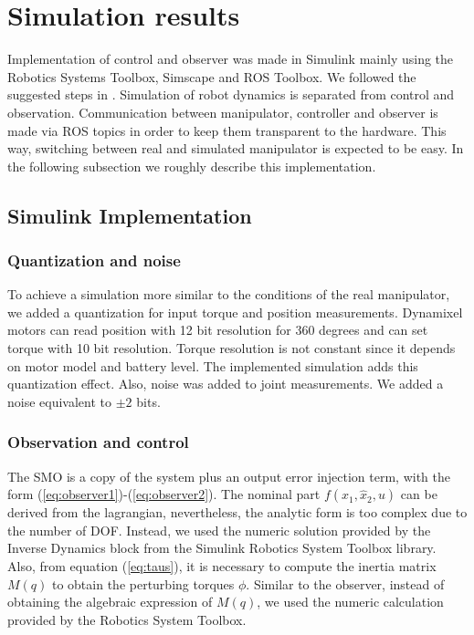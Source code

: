 \documentclass[conference,letterpaper]{ieeeconf}
\begin{document}
\section{Simulation results}
\label{sec:Results}

Implementation of control and observer was made in Simulink mainly using the Robotics Systems Toolbox, Simscape and ROS Toolbox. We followed the suggested steps in \cite{matlab_designing, matlab_trajectory}. Simulation of robot dynamics is separated from control and observation. Communication between manipulator, controller and observer is made via ROS topics in order to keep them transparent to the hardware. This way, switching between real and simulated manipulator is expected to be easy. In the following subsection we roughly describe this implementation.

\subsection{Simulink Implementation}
\subsubsection*{Quantization and noise}
To achieve a simulation more similar to the conditions of the real manipulator, we added a quantization for input torque and position measurements. Dynamixel motors can read position with 12 bit resolution for 360 degrees and can set torque with 10 bit resolution. Torque resolution is not constant since it depends on motor model and battery level. The implemented simulation adds this quantization effect. Also, noise was added to joint measurements. We added a noise equivalent to $\pm 2$ bits. 

\subsubsection*{Observation and control}
The SMO is a copy of the system plus an output error injection term, with the form (\ref{eq:observer1})-(\ref{eq:observer2}). The nominal part $f(x_1, \hat{x}_2, u)$ can be derived from the lagrangian, nevertheless, the analytic form is too complex due to the number of DOF. Instead, we used the numeric solution provided by the Inverse Dynamics block from the Simulink Robotics System Toolbox library. Also, from equation (\ref{eq:taus}), it is necessary to compute the inertia matrix $M(q)$ to obtain the perturbing torques $\phi$. Similar to the observer, instead of obtaining the algebraic expression of $M(q)$, we used the numeric calculation provided by the Robotics System Toolbox.
  
\end{document}
